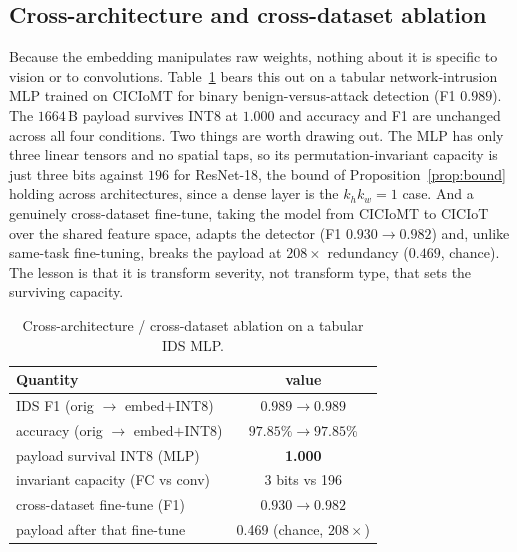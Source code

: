 \documentclass[10pt,journal]{IEEEtran}
\theoremstyle{remark}
\begin{document}
\subsection{Cross-architecture and cross-dataset ablation}\label{sec:ablation}
Because the embedding manipulates raw weights, nothing about it is specific to vision
or to convolutions. Table~\ref{tab:ablation} bears this out on a tabular
network-intrusion MLP trained on CICIoMT \cite{dadkhah2024ciciomt2024} for binary
benign-versus-attack detection (F1 $0.989$). The $1664$\,B payload survives INT8 at
$1.000$ and accuracy and F1 are unchanged across all four conditions. Two things are
worth drawing out. The MLP has only three linear tensors and no spatial taps, so its
permutation-invariant capacity is just three bits against $196$ for ResNet-18, the
bound of Proposition~\ref{prop:bound} holding across architectures, since a dense layer
is the $k_h k_w=1$ case. And a genuinely cross-dataset fine-tune, taking the model from
CICIoMT to CICIoT \cite{neto2023ciciot2023} over the shared feature space, adapts the
detector (F1 $0.930\!\to\!0.982$) and, unlike same-task fine-tuning, breaks the payload
at $208\times$ redundancy ($0.469$, chance). The lesson is that it is transform
severity, not transform type, that sets the surviving capacity.

\begin{table}[!tb]\centering
\caption{Cross-architecture / cross-dataset ablation on a tabular IDS MLP.}
\label{tab:ablation}
\begin{tabular*}{\columnwidth}{@{\extracolsep{\fill}}lc@{}}
\toprule
Quantity & value\\
\midrule
IDS F1 (orig $\to$ embed$+$INT8) & $0.989\to0.989$\\
accuracy (orig $\to$ embed$+$INT8) & $97.85\%\to97.85\%$\\
payload survival INT8 (MLP) & \textbf{1.000}\\
invariant capacity (FC vs conv) & 3 bits vs 196\\
cross-dataset fine-tune (F1) & $0.930\to0.982$\\
\quad payload after that fine-tune & 0.469 (chance, $208\times$)\\
\bottomrule
\end{tabular*}
\end{table}

\end{document}
